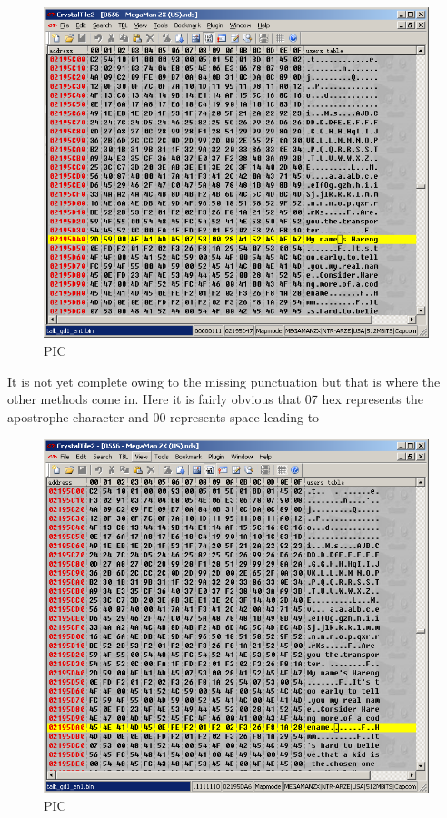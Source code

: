 \documentclass[
]{book}
\begin{document}
\begin{figure}
\centering
\includegraphics{images/86_home_fast6191_romhackingguide_unrenamed_file___relativesearchcrystaltile2basictableexample.png}
\caption{PIC}
\end{figure}

It is not yet complete owing to the missing punctuation but that is where the other methods come in. Here it is fairly obvious that 07 hex represents the apostrophe character and 00 represents space leading to

\begin{figure}
\centering
\includegraphics{images/87_home_fast6191_romhackingguide_unrenamed_file___elativesearchcrystaltile2basictableexample2.png}
\caption{PIC}
\end{figure}
\end{document}
